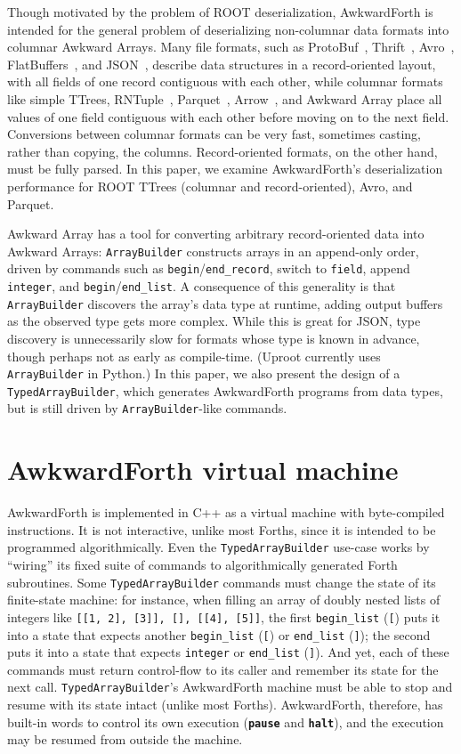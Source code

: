 \documentclass{webofc}
\begin{document}
Though motivated by the problem of ROOT deserialization, AwkwardForth is intended for the general problem of deserializing non-columnar data formats into columnar Awkward Arrays. Many file formats, such as ProtoBuf~\cite{protobuf}, Thrift~\cite{thrift}, Avro~\cite{avro}, FlatBuffers~\cite{flatbuffers}, and JSON~\cite{json}, describe data structures in a record-oriented layout, with all fields of one record contiguous with each other, while columnar formats like simple TTrees, RNTuple~\cite{rntuple}, Parquet~\cite{parquet}, Arrow~\cite{arrow}, and Awkward Array place all values of one field contiguous with each other before moving on to the next field. Conversions between columnar formats can be very fast, sometimes casting, rather than copying, the columns. Record-oriented formats, on the other hand, must be fully parsed. In this paper, we examine AwkwardForth's deserialization performance for ROOT TTrees (columnar and record-oriented), Avro, and Parquet.

Awkward Array has a tool for converting arbitrary record-oriented data into Awkward Arrays: {\tt ArrayBuilder} constructs arrays in an append-only order, driven by commands such as {\tt begin}/{\tt end\_record}, switch to {\tt field}, append {\tt integer}, and {\tt begin}/{\tt end\_list}. A consequence of this generality is that {\tt ArrayBuilder} discovers the array's data type at runtime, adding output buffers as the observed type gets more complex. While this is great for JSON, type discovery is unnecessarily slow for formats whose type is known in advance, though perhaps not as early as compile-time. (Uproot currently uses {\tt ArrayBuilder} in Python.) In this paper, we also present the design of a {\tt TypedArrayBuilder}, which generates AwkwardForth programs from data types, but is still driven by {\tt ArrayBuilder}-like commands.

\section{AwkwardForth virtual machine}

AwkwardForth is implemented in C++ as a virtual machine with byte-compiled instructions. It is not interactive, unlike most Forths, since it is intended to be programmed algorithmically. Even the {\tt TypedArrayBuilder} use-case works by ``wiring'' its fixed suite of commands to algorithmically generated Forth subroutines. Some {\tt TypedArrayBuilder} commands must change the state of its finite-state machine: for instance, when filling an array of doubly nested lists of integers like {\tt [[1,\,2],\,[3]],\,[],\,[[4],\,[5]]}, the first {\tt begin\_list} ({\tt [}) puts it into a state that expects another {\tt begin\_list} ({\tt [}) or {\tt end\_list} ({\tt ]}); the second puts it into a state that expects {\tt integer} or {\tt end\_list} ({\tt ]}). And yet, each of these commands must return control-flow to its caller and remember its state for the next call. {\tt TypedArrayBuilder}'s AwkwardForth machine must be able to stop and resume with its state intact (unlike most Forths). AwkwardForth, therefore, has built-in words to control its own execution (\textcolor{OliveGreen}{\tt\textbf{pause}} and \textcolor{OliveGreen}{\tt\textbf{halt}}), and the execution may be resumed from outside the machine.
\end{document}
